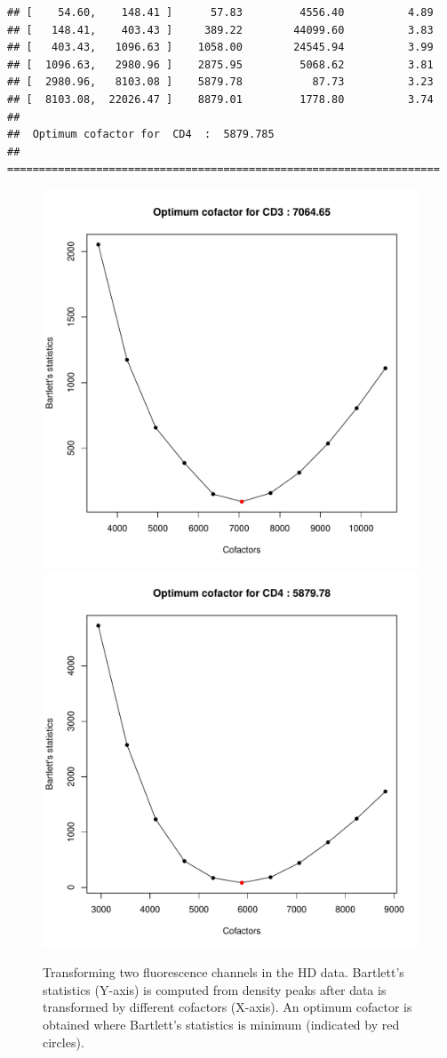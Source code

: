 \documentclass{article}\usepackage[]{graphicx}\usepackage[]{color}
\makeatletter
\newenvironment{kframe}{%
 \def\at@end@of@kframe{}%
 \ifinner\ifhmode%
  \def\at@end@of@kframe{\end{minipage}}%
  \begin{minipage}{\columnwidth}%
 \fi\fi%
 \def\FrameCommand##1{\hskip\@totalleftmargin \hskip-\fboxsep
 \colorbox{shadecolor}{##1}\hskip-\fboxsep
     \hskip-\linewidth \hskip-\@totalleftmargin \hskip\columnwidth}%
 \MakeFramed {\advance\hsize-\width
   \@totalleftmargin\z@ \linewidth\hsize
   \@setminipage}}%
 {\par\unskip\endMakeFramed%
 \at@end@of@kframe}
\newenvironment{knitrout}{}{} %
\makeatother
\begin{document}
\begin{knitrout}
\begin{kframe}
\begin{verbatim}
## [    54.60,    148.41 ]      57.83         4556.40          4.89 
## [   148.41,    403.43 ]     389.22        44099.60          3.83 
## [   403.43,   1096.63 ]    1058.00        24545.94          3.99 
## [  1096.63,   2980.96 ]    2875.95         5068.62          3.81 
## [  2980.96,   8103.08 ]    5879.78           87.73          3.23 
## [  8103.08,  22026.47 ]    8879.01         1778.80          3.74
## 
##  Optimum cofactor for  CD4  :  5879.785 
## ====================================================================
\end{verbatim}
\end{kframe}\begin{figure}
\includegraphics[width=.49\linewidth]{figure/HD-1} 
\includegraphics[width=.49\linewidth]{figure/HD-2} \caption[Transforming two fluorescence channels in the HD data]{Transforming two fluorescence channels in the HD data. Bartlett's statistics (Y-axis) is computed from density peaks after data is transformed by different cofactors (X-axis). An optimum cofactor is obtained where Bartlett's statistics is minimum (indicated by red circles).}\label{fig:HD}
\end{figure}


\end{knitrout}
\end{document}
